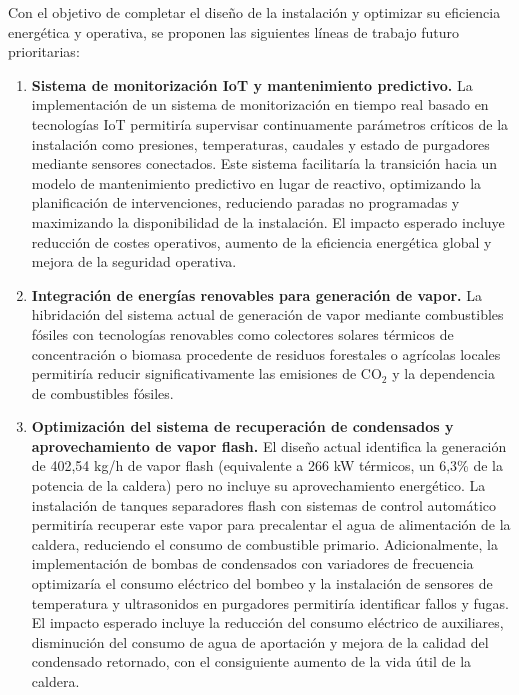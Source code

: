 \documentclass[12pt]{article}
\begin{document}
Con el objetivo de completar el diseño de la instalación y optimizar su eficiencia energética y operativa, se proponen las siguientes líneas de trabajo futuro prioritarias:

\begin{enumerate}[label=\arabic*., leftmargin=2em]
	\item \textbf{Sistema de monitorización IoT y mantenimiento predictivo.} La implementación de un sistema de monitorización en tiempo real basado en tecnologías IoT permitiría supervisar continuamente parámetros críticos de la instalación como presiones, temperaturas, caudales y estado de purgadores mediante sensores conectados. Este sistema facilitaría la transición hacia un modelo de mantenimiento predictivo en lugar de reactivo, optimizando la planificación de intervenciones, reduciendo paradas no programadas y maximizando la disponibilidad de la instalación. El impacto esperado incluye reducción de costes operativos, aumento de la eficiencia energética global y mejora de la seguridad operativa.

	\item \textbf{Integración de energías renovables para generación de vapor.} La hibridación del sistema actual de generación de vapor mediante combustibles fósiles con tecnologías renovables como colectores solares térmicos de concentración o biomasa procedente de residuos forestales o agrícolas locales permitiría reducir significativamente las emisiones de CO$_2$ y la dependencia de combustibles fósiles.

	\item \textbf{Optimización del sistema de recuperación de condensados y aprovechamiento de vapor flash.} El diseño actual identifica la generación de 402,54 kg/h de vapor flash (equivalente a 266 kW térmicos, un 6,3\% de la potencia de la caldera) pero no incluye su aprovechamiento energético. La instalación de tanques separadores flash con sistemas de control automático permitiría recuperar este vapor para precalentar el agua de alimentación de la caldera, reduciendo el consumo de combustible primario. Adicionalmente, la implementación de bombas de condensados con variadores de frecuencia optimizaría el consumo eléctrico del bombeo y la instalación de sensores de temperatura y ultrasonidos en purgadores permitiría identificar fallos y fugas. El impacto esperado incluye la reducción del consumo eléctrico de auxiliares, disminución del consumo de agua de aportación y mejora de la calidad del condensado retornado, con el consiguiente aumento de la vida útil de la caldera.
\end{enumerate}
\end{document}
